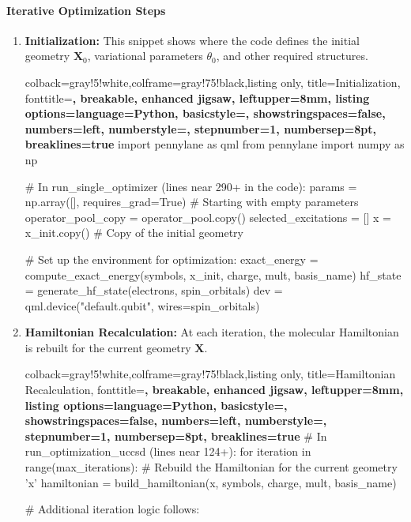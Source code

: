 \paragraph{Iterative Optimization Steps}
\begin{enumerate}
    \item \textbf{Initialization:}
    This snippet shows where the code defines the initial geometry \(\mathbf{X}_0\), variational parameters \(\theta_0\), and other required structures.
    \begin{tcblisting}{colback=gray!5!white,colframe=gray!75!black,listing only,
        title=Initialization, fonttitle=\bfseries, breakable, enhanced jigsaw, leftupper=8mm,
        listing options={language=Python, basicstyle=\ttfamily\small,
        showstringspaces=false, numbers=left, numberstyle=\footnotesize,
        stepnumber=1, numbersep=8pt, breaklines=true}}
import pennylane as qml
from pennylane import numpy as np

# In run_single_optimizer (lines near 290+ in the code):
params = np.array([], requires_grad=True)  # Starting with empty parameters
operator_pool_copy = operator_pool.copy()
selected_excitations = []
x = x_init.copy()  # Copy of the initial geometry

# Set up the environment for optimization:
exact_energy = compute_exact_energy(symbols, x_init, charge, mult, basis_name)
hf_state = generate_hf_state(electrons, spin_orbitals)
dev = qml.device("default.qubit", wires=spin_orbitals)
    \end{tcblisting}

    \item \textbf{Hamiltonian Recalculation:}
    At each iteration, the molecular Hamiltonian is rebuilt for the current geometry \(\mathbf{X}\).
    \begin{tcblisting}{colback=gray!5!white,colframe=gray!75!black,listing only,
        title=Hamiltonian Recalculation, fonttitle=\bfseries, breakable, enhanced jigsaw, leftupper=8mm,
        listing options={language=Python, basicstyle=\ttfamily\small,
        showstringspaces=false, numbers=left, numberstyle=\footnotesize,
        stepnumber=1, numbersep=8pt, breaklines=true}}
# In run_optimization_uccsd (lines near 124+):
for iteration in range(max_iterations):
    # Rebuild the Hamiltonian for the current geometry 'x'
    hamiltonian = build_hamiltonian(x, symbols, charge, mult, basis_name)
    
    # Additional iteration logic follows:
    \end{tcblisting}


\end{enumerate}

